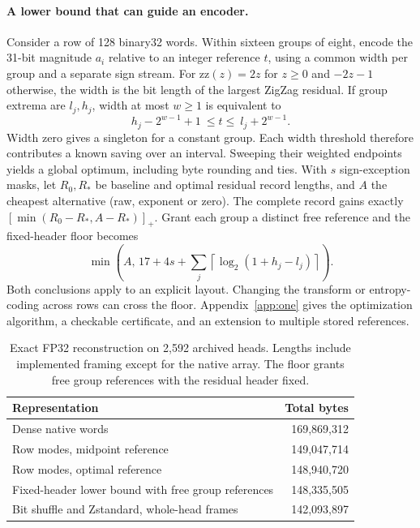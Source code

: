 \paragraph{A lower bound that can guide an encoder.}
Consider a row of 128 binary32 words. Within sixteen groups of eight, encode the 31-bit magnitude $a_i$ relative to an integer reference $t$, using a common width per group and a separate sign stream. For $\mathrm{zz}(z)=2z$ for $z\ge0$ and $-2z-1$ otherwise, the width is the bit length of the largest ZigZag residual. If group extrema are $l_j,h_j$, width at most $w\ge1$ is equivalent to
\[
  h_j-2^{w-1}+1\ \le t\le\ l_j+2^{w-1}.
\]
Width zero gives a singleton for a constant group. Each width threshold therefore contributes a known saving over an interval. Sweeping their weighted endpoints yields a global optimum, including byte rounding and ties. With $s$ sign-exception masks, let $R_0,R_*$ be baseline and optimal residual record lengths, and $A$ the cheapest alternative (raw, exponent or zero). The complete record gains exactly $[\min(R_0-R_*,A-R_*)]_+$. Grant each group a distinct free reference and the fixed-header floor becomes
\[
 \min\!\left(A,\,17+4s+\sum_j\left\lceil\log_2(1+h_j-l_j)\right\rceil\right).
\]
Both conclusions apply to an explicit layout. Changing the transform or entropy-coding across rows can cross the floor. Appendix~\ref{app:one} gives the optimization algorithm, a checkable certificate, and an extension to multiple stored references.

\begin{table}[t]\centering\small
\caption{Exact FP32 reconstruction on 2,592 archived heads. Lengths include implemented framing except for the native array. The floor grants free group references with the residual header fixed.}\label{tab:bytes}
\begin{tabular}{@{}lr@{}}\toprule Representation & Total bytes\\\midrule
Dense native words &169,869,312\\
Row modes, midpoint reference &149,047,714\\
Row modes, optimal reference &148,940,720\\
Fixed-header lower bound with free group references &148,335,505\\
Bit shuffle and Zstandard, whole-head frames &142,093,897\\\bottomrule
\end{tabular}
\end{table}


